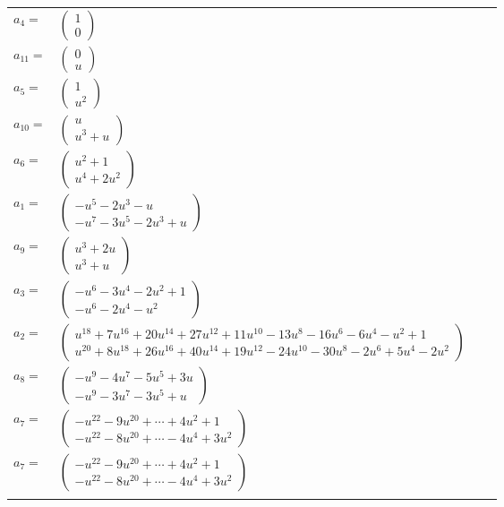 \documentclass[1p]{elsarticle_modified}
\theoremstyle{definition}
\begin{document}
\begin{tabular}{m{7pt} m{180pt} m{7pt} m{180pt} }
\flushright $a_{4}=$&$\begin{pmatrix}1\\0\end{pmatrix}$ \\
\flushright $a_{11}=$&$\begin{pmatrix}0\\u\end{pmatrix}$ \\
\flushright $a_{5}=$&$\begin{pmatrix}1\\u^2\end{pmatrix}$ \\
\flushright $a_{10}=$&$\begin{pmatrix}u\\u^3+u\end{pmatrix}$ \\
\flushright $a_{6}=$&$\begin{pmatrix}u^2+1\\u^4+2 u^2\end{pmatrix}$ \\
\flushright $a_{1}=$&$\begin{pmatrix}- u^5-2 u^3- u\\- u^7-3 u^5-2 u^3+u\end{pmatrix}$ \\
\flushright $a_{9}=$&$\begin{pmatrix}u^3+2 u\\u^3+u\end{pmatrix}$ \\
\flushright $a_{3}=$&$\begin{pmatrix}- u^6-3 u^4-2 u^2+1\\- u^6-2 u^4- u^2\end{pmatrix}$ \\
\flushright $a_{2}=$&$\begin{pmatrix}u^{18}+7 u^{16}+20 u^{14}+27 u^{12}+11 u^{10}-13 u^8-16 u^6-6 u^4- u^2+1\\u^{20}+8 u^{18}+26 u^{16}+40 u^{14}+19 u^{12}-24 u^{10}-30 u^8-2 u^6+5 u^4-2 u^2\end{pmatrix}$ \\
\flushright $a_{8}=$&$\begin{pmatrix}- u^9-4 u^7-5 u^5+3 u\\- u^9-3 u^7-3 u^5+u\end{pmatrix}$ \\
\flushright $a_{7}=$&$\begin{pmatrix}- u^{22}-9 u^{20}+\cdots+4 u^2+1\\- u^{22}-8 u^{20}+\cdots-4 u^4+3 u^2\end{pmatrix}$\\ \flushright $a_{7}=$&$\begin{pmatrix}- u^{22}-9 u^{20}+\cdots+4 u^2+1\\- u^{22}-8 u^{20}+\cdots-4 u^4+3 u^2\end{pmatrix}$\\&\end{tabular}
\end{document}
